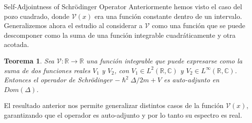 \documentclass[aspectratio=1610]{beamer}
\newcommand*{\field}[1]{\mathbb{#1}}
\newtheorem*{teo}{Teorema}
\begin{document}
\begin{frame}{Self-Adjointness of Schrödinger Operator}
Anteriormente hemos visto el caso del pozo cuadrado, donde $\mathcal{V}(x)$ era una función constante dentro de un intervalo. Generalizemos ahora el estudio al considerar a $\mathcal{V}$ como una función que se puede descomponer como la suma de una función integrable cuadráticamente y otra acotada.

\vspace{0.04\textheight}

\begin{teo}
    Sea $\mathcal{V}:\field{R}\longrightarrow\field{R}$ una función integrable que puede expresarse como la suma de dos funciones reales $V_{1}$ y $V_{2}$, con $V_{1}\in L^{2}(\field{R},\field{C})$ y $V_{2}\in L^{\infty}(\field{R},\field{C})$. Entonces el operador de Schrödinger $-\hslash^2 \Delta/2m + V$ es auto-adjunto en $Dom(\Delta)$.
    \label{teo:SCOperator}
\end{teo}

\vspace{0.04\textheight}
    
El resultado anterior nos permite generalizar distintos casos de la función $\mathcal{V}(x)$, garantizando que el operador es auto-adjunto y por lo tanto su espectro es real.    
    
\end{frame}
\end{document}
